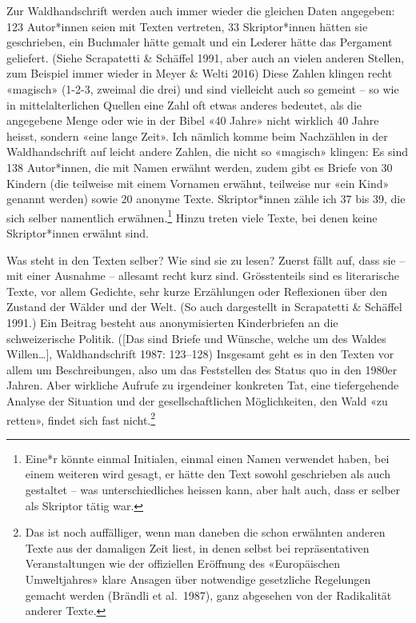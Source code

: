 \documentclass[a4paper,
fontsize=11pt,
oneside,
numbers=noperiodatend,
parskip=half-,
bibliography=totoc,
final
]{scrartcl}
\begin{document}
Zur Waldhandschrift werden auch immer wieder die gleichen Daten
angegeben: 123 Autor*innen seien mit Texten vertreten, 33 Skriptor*innen
hätten sie geschrieben, ein Buchmaler hätte gemalt und ein Lederer hätte
das Pergament geliefert. (Siehe Scrapatetti \& Schäffel 1991, aber auch
an vielen anderen Stellen, zum Beispiel immer wieder in Meyer \& Welti
2016) Diese Zahlen klingen recht «magisch» (1-2-3, zweimal die drei) und
sind vielleicht auch so gemeint -- so wie in mittelalterlichen Quellen
eine Zahl oft etwas anderes bedeutet, als die angegebene Menge oder wie
in der Bibel «40 Jahre» nicht wirklich 40 Jahre heisst, sondern «eine
lange Zeit». Ich nämlich komme beim Nachzählen in der Waldhandschrift
auf leicht andere Zahlen, die nicht so «magisch» klingen: Es sind 138
Autor*innen, die mit Namen erwähnt werden, zudem gibt es Briefe von 30
Kindern (die teilweise mit einem Vornamen erwähnt, teilweise nur «ein
Kind» genannt werden) sowie 20 anonyme Texte. Skriptor*innen zähle ich
37 bis 39, die sich selber namentlich erwähnen.\footnote{Eine*r könnte
  einmal Initialen, einmal einen Namen verwendet haben, bei einem
  weiteren wird gesagt, er hätte den Text sowohl geschrieben als auch
  gestaltet -- was unterschiedliches heissen kann, aber halt auch, dass
  er selber als Skriptor tätig war.} Hinzu treten viele Texte, bei denen
keine Skriptor*innen erwähnt sind.

Was steht in den Texten selber? Wie sind sie zu lesen? Zuerst fällt auf,
dass sie -- mit einer Ausnahme -- allesamt recht kurz sind.
Grösstenteils sind es literarische Texte, vor allem Gedichte, sehr kurze
Erzählungen oder Reflexionen über den Zustand der Wälder und der Welt.
(So auch dargestellt in Scrapatetti \& Schäffel 1991.) Ein Beitrag
besteht aus anonymisierten Kinderbriefen an die schweizerische Politik.
({[}Das sind Briefe und Wünsche, welche um des Waldes Willen\ldots{]},
Waldhandschrift 1987: 123--128) Insgesamt geht es in den Texten vor
allem um Beschreibungen, also um das Feststellen des Status quo in den
1980er Jahren. Aber wirkliche Aufrufe zu irgendeiner konkreten Tat, eine
tiefergehende Analyse der Situation und der gesellschaftlichen
Möglichkeiten, den Wald «zu retten», findet sich fast nicht.\footnote{Das
  ist noch auffälliger, wenn man daneben die schon erwähnten anderen
  Texte aus der damaligen Zeit liest, in denen selbst bei
  repräsentativen Veranstaltungen wie der offiziellen Eröffnung des
  «Europäischen Umweltjahres» klare Ansagen über notwendige gesetzliche
  Regelungen gemacht werden (Brändli et al.~1987), ganz abgesehen von
  der Radikalität anderer Texte.}
\end{document}
